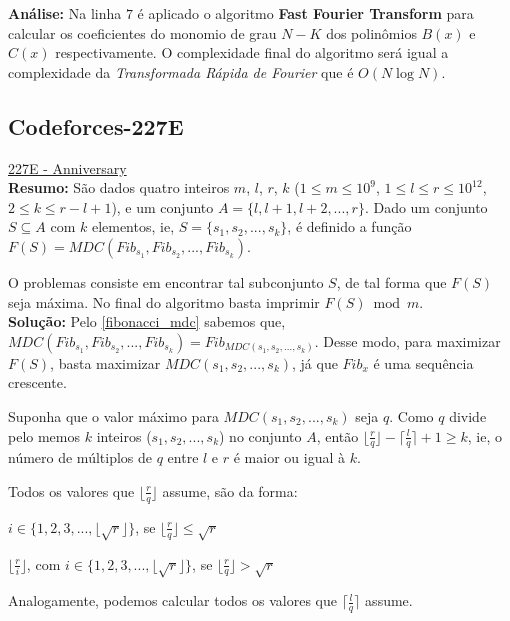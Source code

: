 \textbf{Análise:}
Na linha $7$ é aplicado o algoritmo \textbf{Fast Fourier Transform} para calcular os coeficientes do monomio de grau $N-K$ dos 
polinômios $B(x)$ e $C(x)$ respectivamente. O complexidade final do algoritmo será igual a complexidade da \textit{Transformada Rápida de Fourier} que é $O(N\log N)$.



\subsection{Codeforces-227E}
\href{http://codeforces.com/contest/227/problem/E}{227E - Anniversary}\\

\textbf{Resumo:}
São dados quatro inteiros $m$, $l$, $r$, $k$ ($1\leq m\leq 10^9$, $1\leq l \leq r \leq 10^{12}$, $2\leq k\leq r-l+1$), 
e um conjunto $A = \{l,l+1,l+2,...,r\}$.
Dado um conjunto $S \subseteq A$ com $k$ elementos, ie, $S = \{s_1, s_2,...,s_k\}$, é definido a função 
$F(S) = MDC(Fib_{s_1}, Fib_{s_2}, ..., Fib_{s_k})$.

O problemas consiste em encontrar tal subconjunto $S$, de tal forma que $F(S)$ seja máxima. No final do algoritmo basta imprimir 
$F(S) \bmod m$.
\\

\textbf{Solução:}
Pelo \autoref{fibonacci_mdc} sabemos que, $MDC(Fib_{s_1}, Fib_{s_2}, ..., Fib_{s_k}) = Fib_{MDC(s_1,s_2,...,s_k)}$.
Desse modo, para maximizar $F(S)$, basta maximizar $MDC(s_1,s_2,...,s_k)$, já que $Fib_x$ é uma sequência crescente.

Suponha que o valor máximo para $MDC(s_1,s_2,...,s_k)$ seja $q$. Como $q$ divide pelo memos $k$ inteiros ($s_1,s_2,...,s_k$)
no conjunto $A$, então $\lfloor \frac{r}{q} \rfloor -\lceil \frac{l}{q} \rceil + 1 \geq k$, ie, o número de múltiplos de $q$ entre $l$ e $r$ é maior ou igual à $k$.

Todos os valores que $\lfloor \frac{r}{q} \rfloor$ assume, são da forma:
\newline

$i \in \{1,2,3,...,\lfloor\sqrt{r}\rfloor\}$, se $\lfloor \frac{r}{q} \rfloor \leq \sqrt{r}$

$\lfloor \frac{r}{i} \rfloor$, com $i \in \{1,2,3,...,\lfloor\sqrt{r}\rfloor\}$, se $\lfloor \frac{r}{q} \rfloor > \sqrt{r}$
\newline

Analogamente, podemos calcular todos os valores que $\lceil \frac{l}{q} \rceil$ assume.


